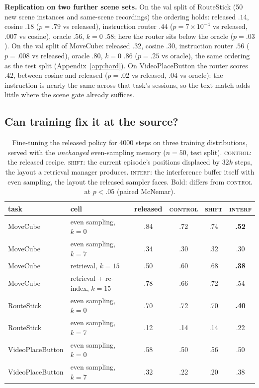 \documentclass{article}
\newcommand{\sys}[1]{\textsc{#1}}
\begin{document}
\textbf{Replication on two further scene sets.} On the val split of RouteStick (50 new scene instances and same-scene recordings) the ordering holds: released $.14$, cosine $.18$ ($p=.79$ vs released), instruction router $.44$ ($p=7\times10^{-4}$ vs released, $.007$ vs cosine), oracle $.56$, $k{=}0$ $.58$; here the router sits below the oracle ($p=.03$). On the val split of MoveCube: released $.32$, cosine $.30$, instruction router $.56$ ($p=.008$ vs released), oracle $.80$, $k{=}0$ $.86$ ($p=.25$ vs oracle), the same ordering as the test split (Appendix~\ref{app:hard}). On VideoPlaceButton the router scores $.42$, between cosine and released ($p=.02$ vs released, $.04$ vs oracle): the instruction is nearly the same across that task's sessions, so the text match adds little where the scene gate already suffices.

\subsection{Can training fix it at the source?}
\label{sec:train}

\begin{table}[tb]
\centering\small
\caption{Fine-tuning the released policy for 4000 steps on three training distributions, served with the \emph{unchanged} even-sampling memory ($n{=}50$, test split). \sys{control}: the released recipe. \sys{shift}: the current episode's positions displaced by $32k$ steps, the layout a retrieval manager produces. \sys{interf}: the interference buffer itself with even sampling, the layout the released sampler faces. Bold: differs from \sys{control} at $p<.05$ (paired McNemar).}
\label{tab:train}
\setlength{\tabcolsep}{5pt}\footnotesize
\begin{tabular}{llcccc}
\toprule
task & cell & released & \sys{control} & \sys{shift} & \sys{interf}\\
\midrule
MoveCube & even sampling, $k{=}0$ & .84 & .72 & .74 & \textbf{.52}\\
MoveCube & even sampling, $k{=}7$ & .34 & .30 & .32 & .30\\
MoveCube & retrieval, $k{=}15$ & .50 & .60 & .68 & \textbf{.38}\\
MoveCube & retrieval + re-index, $k{=}15$ & .78 & .66 & .72 & .54\\
RouteStick & even sampling, $k{=}0$ & .70 & .72 & .70 & \textbf{.40}\\
RouteStick & even sampling, $k{=}7$ & .12 & .14 & .14 & .22\\
VideoPlaceButton & even sampling, $k{=}0$ & .58 & .50 & .56 & .50\\
VideoPlaceButton & even sampling, $k{=}7$ & .32 & .22 & .20 & .38\\
\bottomrule
\end{tabular}
\end{table}
\end{document}
